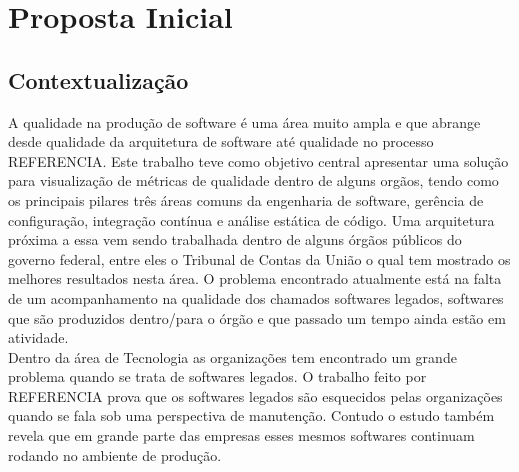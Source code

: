 
\chapter[Proposta Inicial]{Proposta Inicial}
	


\section{Contextualização}
	A qualidade na produção de software é uma área muito ampla e que abrange desde qualidade da arquitetura de software até qualidade no processo REFERENCIA. Este trabalho teve como objetivo central apresentar uma solução para visualização de métricas de qualidade dentro de alguns orgãos, tendo como os principais pilares três áreas comuns da engenharia de software, gerência de configuração, integração contínua e análise estática de código. Uma arquitetura próxima a essa vem sendo trabalhada dentro de alguns órgãos públicos do governo federal, entre eles o Tribunal de Contas da União o qual tem mostrado os melhores resultados nesta área. O problema encontrado atualmente está na falta de um acompanhamento na qualidade dos chamados softwares legados, softwares que são produzidos dentro/para o órgão e que passado um tempo ainda estão em atividade.
	\\Dentro da área de Tecnologia as organizações tem encontrado um grande problema quando se trata de softwares legados. O trabalho feito por REFERENCIA prova que os softwares legados são esquecidos pelas organizações quando se fala sob uma perspectiva de manutenção. Contudo o estudo também revela que em grande parte das empresas esses mesmos softwares continuam rodando no ambiente de produção.
	
	
	

